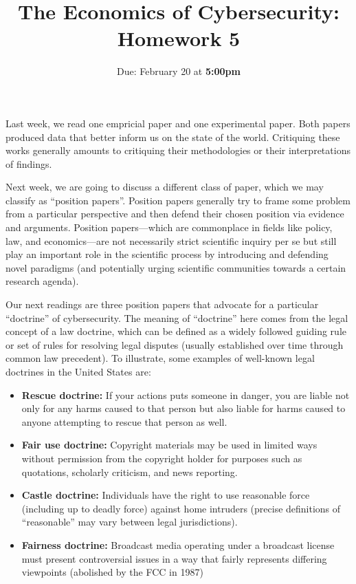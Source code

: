 \documentclass[11pt]{article}
\title{The Economics of Cybersecurity: Homework 5}
\date{Due: February 20 at {\bf 5:00pm}}
\author{}
\begin{document}
\maketitle


\section*{}

Last week, we read one empricial paper and one experimental paper. Both papers produced data that better inform us on the state of the world. Critiquing these works generally amounts to critiquing their methodologies or their interpretations of findings. 

Next week, we are going to discuss a different class of paper, which we may classify as ``position papers''.
Position papers generally try to frame some problem from a particular perspective and then defend their chosen position via evidence and arguments. 
Position papers---which are commonplace in fields like policy, law, and economics---are not necessarily strict scientific inquiry per se but still play an important role in the scientific process by introducing and defending novel paradigms (and potentially urging scientific communities towards a certain research agenda). 

Our next readings are three position papers that advocate for a particular ``doctrine'' of cybersecurity. The meaning of ``doctrine'' here comes from the legal concept of a law doctrine, which can be defined as a widely followed guiding rule or set of rules for resolving legal disputes (usually established over time through common law precedent).
To illustrate, some examples of well-known legal doctrines in the United States are:
\begin{itemize}
    \item {\bf Rescue doctrine:} If your actions puts someone in danger, you are liable not only for any harms caused to that person but also liable for harms caused to anyone attempting to rescue that person as well. 
    \item {\bf Fair use doctrine:} Copyright materials may be used in limited ways without permission from the copyright holder for purposes such as quotations, scholarly criticism, and news reporting. 
    \item {\bf Castle doctrine:} Individuals have the right to use reasonable force (including up to deadly force) against home intruders (precise definitions of ``reasonable'' may vary between legal jurisdictions).
    \item {\bf Fairness doctrine:} Broadcast media operating under a broadcast license must present controversial issues in a way that fairly represents differing viewpoints (abolished by the FCC in 1987)
\end{itemize}
\end{document}
